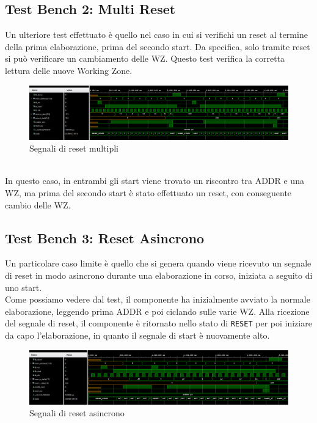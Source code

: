 \documentclass{article}
\begin{document}
\subsection{Test Bench 2: Multi Reset}
Un ulteriore test effettuato è quello nel caso in cui si verifichi un reset al termine della prima elaborazione, prima del secondo start. Da specifica, solo tramite reset si può verificare un cambiamento delle WZ. Questo test verifica la corretta lettura delle nuove Working Zone.\\
\begin{figure}[H]
    \centering
    \includegraphics[width=1.0\textwidth]{images/test-multi-reset.png}
        \caption{Segnali di reset multipli}
    \label{fig:test-multi-reset}
\end{figure}
\noindent\\ In questo caso, in entrambi gli start viene trovato un riscontro tra ADDR e una WZ, ma prima del secondo start è stato effettuato un reset, con conseguente cambio delle WZ.

\subsection{Test Bench 3: Reset Asincrono}
Un particolare caso limite è quello che si genera quando viene ricevuto un segnale di reset in modo asincrono durante una elaborazione in corso, iniziata a seguito di uno start.\\Come possiamo vedere dal test, il componente ha inizialmente avviato la normale elaborazione, leggendo prima ADDR e poi ciclando sulle varie WZ. Alla ricezione del segnale di reset, il componente è ritornato nello stato di \verb^RESET^ per poi iniziare da capo l'elaborazione, in quanto il segnale di start è nuovamente alto.\\ 
\begin{figure}[H]
    \centering
    \includegraphics[width=1.0\textwidth]{images/test-reset-async.png}
        \caption{Segnali di reset asincrono}
    \label{fig:test-reset-async}
\end{figure}
\end{document}
